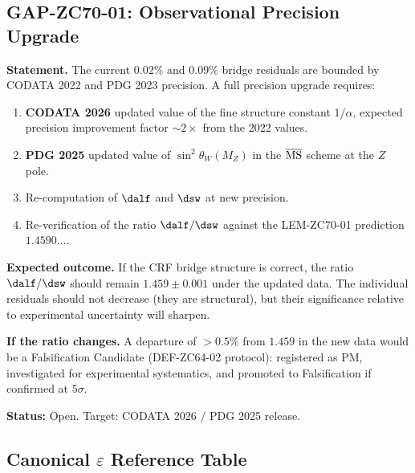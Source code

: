 \documentclass[12pt, a4paper]{article}
\renewcommand{\swsq}{\sin^2\!\theta_W}
\begin{document}
\subsection{GAP-ZC70-01: Observational Precision Upgrade}
\label{sec:gap01}

\begin{openqbox}[title={GAP-ZC70-01: Observational Precision Upgrade ---
  CODATA 2026 / PDG 2025 Target (Open)}]

\textbf{Statement.}
The current $0.02\%$ and $0.09\%$ bridge residuals are
bounded by CODATA 2022 and PDG 2023 precision.
A full precision upgrade requires:

\begin{enumerate}[leftmargin=2em, noitemsep]
  \item \textbf{CODATA 2026} updated value of the fine structure
    constant $1/\alpha$, expected precision improvement
    factor $\sim 2\times$ from the 2022 values.
  \item \textbf{PDG 2025} updated value of $\swsq(M_Z)$
    in the $\overline{\rm MS}$ scheme at the $Z$ pole.
  \item Re-computation of $\dalf$ and $\dsw$ at new precision.
  \item Re-verification of the ratio $\dalf/\dsw$ against
    the LEM-ZC70-01 prediction $1.4590\ldots$.
\end{enumerate}

\textbf{Expected outcome.}
If the CRF bridge structure is correct, the ratio
$\dalf/\dsw$ should remain $1.459 \pm 0.001$ under the
updated data. The individual residuals should not decrease
(they are structural), but their significance relative
to experimental uncertainty will sharpen.

\textbf{If the ratio changes.}
A departure of $>0.5\%$ from $1.459$ in the new data
would be a Falsification Candidate (DEF-ZC64-02 protocol):
registered as PM, investigated for experimental systematics,
and promoted to Falsification if confirmed at $5\sigma$.

\textbf{Status:} Open. Target: CODATA 2026 / PDG 2025 release.
\end{openqbox}

\subsection{Canonical $\varepsilon$ Reference Table}
\label{sec:eps-table}
\end{document}
